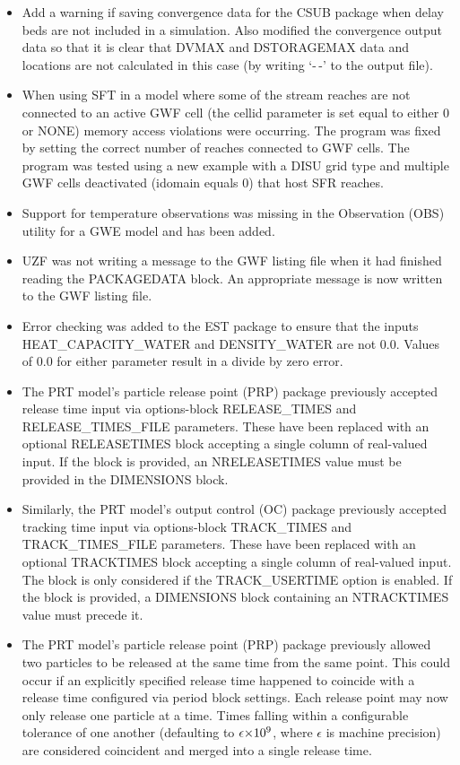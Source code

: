 \begin{itemize}
    \item Add a warning if saving convergence data for the CSUB package when delay beds are not included in a simulation. Also modified the convergence output data so that it is clear that DVMAX and DSTORAGEMAX data and locations are not calculated in this case (by writing `-\,-' to the output file). 
    \item When using SFT in a model where some of the stream reaches are not connected to an active GWF cell (the cellid parameter is set equal to either 0 or NONE) memory access violations were occurring.  The program was fixed by setting the correct number of reaches connected to GWF cells.  The program was tested using a new example with a DISU grid type and multiple GWF cells deactivated (idomain equals 0) that host SFR reaches.
    \item Support for temperature observations was missing in the Observation (OBS) utility for a GWE model and has been added.
    \item UZF was not writing a message to the GWF listing file when it had finished reading the PACKAGEDATA block.  An appropriate message is now written to the GWF listing file.
    \item Error checking was added to the EST package to ensure that the inputs HEAT\_CAPACITY\_WATER and DENSITY\_WATER are not 0.0.  Values of 0.0 for either parameter result in a divide by zero error.
    \item The PRT model's particle release point (PRP) package previously accepted release time input via options-block RELEASE\_TIMES and RELEASE\_TIMES\_FILE parameters. These have been replaced with an optional RELEASETIMES block accepting a single column of real-valued input. If the block is provided, an NRELEASETIMES value must be provided in the DIMENSIONS block.
    \item Similarly, the PRT model's output control (OC) package previously accepted tracking time input via options-block TRACK\_TIMES and TRACK\_TIMES\_FILE parameters. These have been replaced with an optional TRACKTIMES block accepting a single column of real-valued input. The block is only considered if the TRACK\_USERTIME option is enabled. If the block is provided, a DIMENSIONS block containing an NTRACKTIMES value must precede it.
    \item The PRT model's particle release point (PRP) package previously allowed two particles to be released at the same time from the same point. This could occur if an explicitly specified release time happened to coincide with a release time configured via period block settings. Each release point may now only release one particle at a time. Times falling within a configurable tolerance of one another (defaulting to $\sisetup{input-digits = 0123456789\epsilon} \num{\epsilon e+9}$, where $\epsilon$ is machine precision) are considered coincident and merged into a single release time.

\end{itemize}

